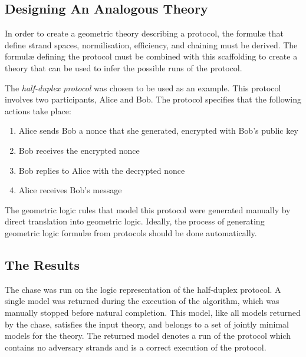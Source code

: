 	\subsection{Designing An Analogous Theory}

		In order to create a geometric theory describing a protocol, the
		formul{\ae} that define strand spaces, normilisation, efficiency, and
		chaining must be derived. The formul{\ae} defining the protocol must be
		combined with this scaffolding to create a theory that can be used to
		infer the possible runs of the protocol.

		The \emph{half-duplex protocol} was chosen to be used as an example.
		This protocol involves two participants, Alice and Bob. The protocol
		specifies that the following actions take place:

		\begin{enumerate}
		\item Alice sends Bob a nonce that she generated, encrypted with Bob's public key
		\item Bob receives the encrypted nonce
		\item Bob replies to Alice with the decrypted nonce
		\item Alice receives Bob's message
		\end{enumerate}

		The geometric logic rules that model this protocol were generated
		manually by direct translation into geometric logic. Ideally, the
		process of generating geometric logic formul{\ae} from protocols should
		be done automatically.

	\subsection{The Results}

		The chase was run on the logic representation of the half-duplex protocol.
		A single model was returned during the execution of the algorithm,
		which was manually stopped before natural completion. This model, like
		all models returned by the chase, satisfies the input theory, and
		belongs to a set of jointly minimal models for the theory. The returned
		model denotes a run of the protocol which contains no adversary strands
		and is a correct execution of the protocol.
